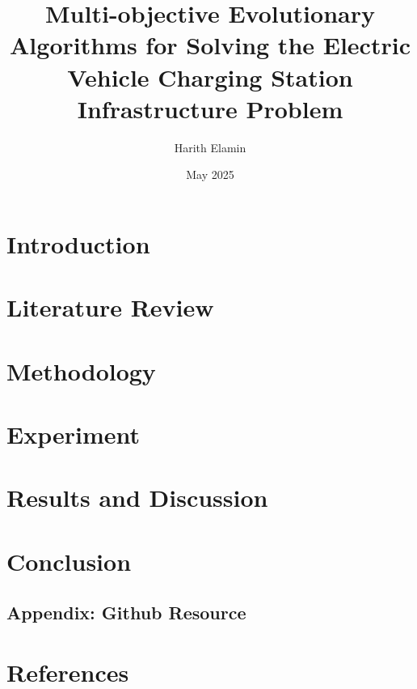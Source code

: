 \documentclass[12pt]{report}
\title{Multi-objective Evolutionary Algorithms for Solving the Electric Vehicle Charging Station Infrastructure Problem}
\author{Harith Elamin}
\date{May 2025}
\begin{document}
\maketitle

\tableofcontents
\newpage

\listoffigures
\newpage



\chapter{Introduction}



\chapter{Literature Review}

\chapter{Methodology}


\chapter{Experiment}

\chapter{Results and Discussion}

\chapter{Conclusion}

\section*{Appendix: Github Resource}


\chapter{References}

\end{document}
